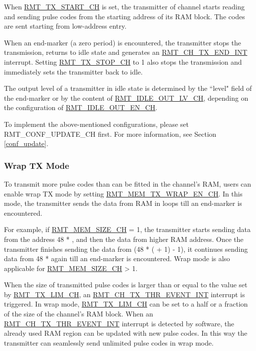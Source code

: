 \documentclass[main\_\_EN.tex]{subfiles}
\begin{document}
When \hyperref[fielddesc:RMTTXSTARTCHN]{RMT\_TX\_START\_CH} is set, the transmitter of channel  starts reading and sending pulse codes from the starting address of its RAM block. The codes are sent starting from low-address entry. 

When an end-marker (a zero period) is encountered, the transmitter stops the transmission, returns to idle state and generates an  \hyperref[int:RMTCHnTXENDINT]{RMT\_CH\_TX\_END\_INT} interrupt. Setting \hyperref[fielddesc:RMTTXSTOPCHN]{RMT\_TX\_STOP\_CH} to 1 also stops the transmission and immediately sets the transmitter back to idle. 

The output level of a transmitter in idle state is determined by the ``level" field of the end-marker or by the content of  \hyperref[fielddesc:RMTIDLEOUTLVCHN]{RMT\_IDLE\_OUT\_LV\_CH}, depending on the configuration of  \hyperref[fielddesc:RMTIDLEOUTENCHN]{RMT\_IDLE\_OUT\_EN\_CH}. 

To implement the above-mentioned configurations, please set RMT\_CONF\_UPDATE\_CH first. For more information, see Section \ref{conf_update}.


\subsubsection{Wrap TX Mode}

To transmit more pulse codes than can be fitted in the channel's RAM, users can enable wrap TX mode by setting \hyperref[fielddesc:RMTMEMTXWRAPENCHN]{RMT\_MEM\_TX\_WRAP\_EN\_CH}. In this mode, the transmitter sends the data from RAM in loops till an end-marker is encountered.

For example, if  \hyperref[fielddesc:RMTMEMSIZECHN]{RMT\_MEM\_SIZE\_CH} = 1, the transmitter starts sending data from the address 48 * , and then the data from higher RAM address. Once the transmitter finishes sending the data from (48 * ( + 1) - 1), it continues sending data from 48 *  again till an end-marker is encountered. Wrap mode is also applicable for \hyperref[fielddesc:RMTMEMSIZECHN]{RMT\_MEM\_SIZE\_CH} > 1.

When the size of transmitted pulse codes is larger than or equal to the value set by  \hyperref[fielddesc:RMTTXLIMCHN]{RMT\_TX\_LIM\_CH}, an \hyperref[int:RMTCHnTXTHREVENTINT]{RMT\_CH\_TX\_THR\_EVENT\_INT} interrupt is triggered. In wrap mode,  \hyperref[fielddesc:RMTTXLIMCHN]{RMT\_TX\_LIM\_CH} can be set to a half or a fraction of the size of the channel's RAM block. When an  \hyperref[int:RMTCHnTXTHREVENTINT]{RMT\_CH\_TX\_THR\_EVENT\_INT} interrupt is detected by software, the already used RAM region can be updated with new pulse codes. In this way the transmitter can seamlessly send unlimited pulse codes in wrap mode.
\end{document}
